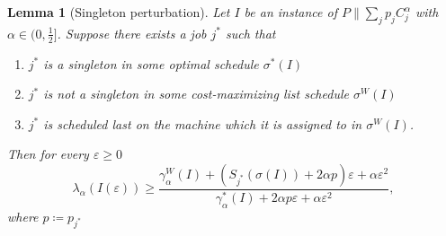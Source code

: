 \documentclass[%
english, titlepage=false %
]{./tum-templates/book/tumbook}
\newtheorem{lemma}{Lemma}
\newcommand{\Problem}{P\!\parallel\!\sum_j p_j C^{\alpha}_j}
\newcommand{\OptCost}{\gamma_{\alpha}^{*}(I)}
\newcommand{\WorstCost}{\gamma_{\alpha}^{W}(I)}
\begin{document}
\begin{lemma}[Singleton perturbation]
\label{lem:critical-singleton-perturbation}
Let $I$ be an instance of $\Problem$ with $\alpha\in \Big(0,\tfrac12\Big]$. Suppose there exists a 
job $j^*$ such that
\begin{enumerate}
    \item $j^*$ is a singleton in some optimal schedule $\sigma^{*}(I)$ 
    \item $j^*$ is not a singleton in some cost-maximizing list schedule $\sigma^{W}(I)$
    \item $j^*$ is scheduled last on the machine which it is assigned to in $\sigma^{W}(I)$.
\end{enumerate}

Then for every $\varepsilon\geq0$
\begin{equation}
    \lambda_{\alpha}(I(\varepsilon))
    \geq
    \frac{
        \WorstCost+(S_{j^*}(\sigma(I))+2\alpha p)\varepsilon
        +\alpha\varepsilon^2
    }{
        \OptCost+2\alpha p\varepsilon
        +\alpha\varepsilon^2
    },
    \label{eq:ratio-perturbation-bound}
\end{equation}
where $p\coloneqq p_{j^*}$
\end{lemma}
\end{document}
